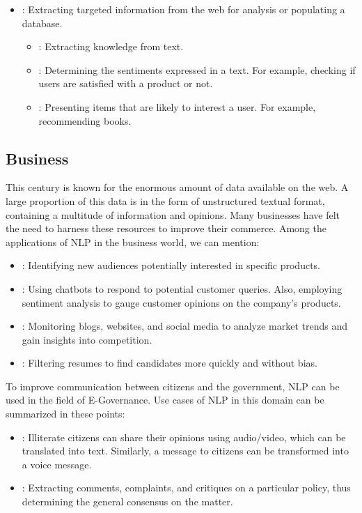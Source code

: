 \documentclass{KBook}
\begin{document}
\begin{itemize}
	\item {}: Extracting targeted information from the web for analysis or populating a database.
	\begin{itemize}
		\item {}: Extracting knowledge from text.
		\item {}: Determining the sentiments expressed in a text. For example, checking if users are satisfied with a product or not.
		\item {}: Presenting items that are likely to interest a user. For example, recommending books.
	\end{itemize}
\end{itemize}


\subsection{Business}

This century is known for the enormous amount of data available on the web. A large proportion of this data is in the form of unstructured textual format, containing a multitude of information and opinions. Many businesses have felt the need to harness these resources to improve their commerce. Among the applications of NLP in the business world, we can mention:

\begin{itemize}
	\item {}: Identifying new audiences potentially interested in specific products.
	\item {}: Using chatbots to respond to potential customer queries. Also, employing sentiment analysis to gauge customer opinions on the company's products.
	\item {}: Monitoring blogs, websites, and social media to analyze market trends and gain insights into competition.
	\item {}: Filtering resumes to find candidates more quickly and without bias.
\end{itemize}

To improve communication between citizens and the government, NLP can be used in the field of E-Governance. Use cases of NLP in this domain can be summarized in these points:

\begin{itemize}
	\item {}: Illiterate citizens can share their opinions using audio/video, which can be translated into text. Similarly, a message to citizens can be transformed into a voice message.
	\item {}: Extracting comments, complaints, and critiques on a particular policy, thus determining the general consensus on the matter.
\end{itemize}
\end{document}
